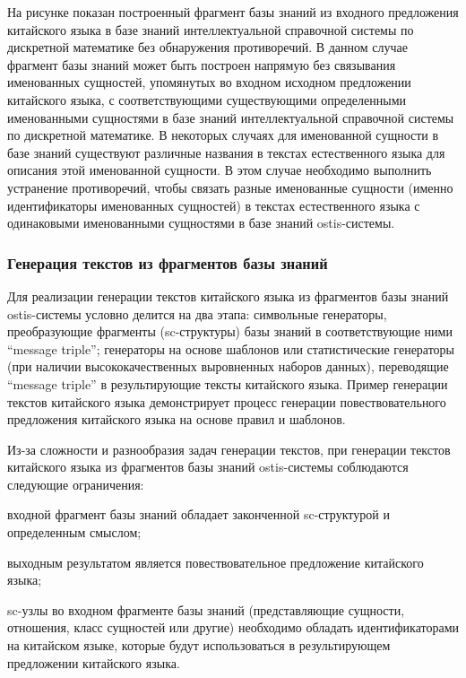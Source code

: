 На рисунке \textit{} показан построенный фрагмент базы знаний из входного предложения китайского языка в базе знаний интеллектуальной справочной системы по дискретной математике без обнаружения противоречий. В данном случае фрагмент базы знаний может быть построен напрямую без связывания именованных сущностей, упомянутых во входном исходном предложении китайского языка, с соответствующими существующими определенными именованными сущностями в базе знаний интеллектуальной справочной системы по дискретной математике. В некоторых случаях для именованной сущности в базе знаний существуют различные названия в текстах естественного языка для описания этой именованной сущности. В этом случае необходимо выполнить устранение противоречий, чтобы связать разные именованные сущности (именно идентификаторы именованных сущностей) в текстах естественного языка с одинаковыми именованными сущностями в базе знаний ostis-системы. 
\subsubsection{Генерация текстов из фрагментов базы знаний}
Для реализации генерации текстов китайского языка из фрагментов базы знаний ostis-системы условно делится на два этапа: символьные генераторы, преобразующие фрагменты (sc-структуры) базы знаний в соответствующие ними ``message triple''; генераторы на основе шаблонов или статистические генераторы (при наличии высококачественных выровненных наборов данных), переводящие ``message triple'' в результирующие тексты китайского языка. Пример генерации текстов китайского языка демонстрирует процесс генерации повествовательного предложения китайского языка на основе правил и шаблонов.

Из-за сложности и разнообразия задач генерации текстов, при генерации текстов китайского языка из фрагментов базы знаний ostis-системы соблюдаются следующие ограничения:
\begin{textitemize}
	\item входной фрагмент базы знаний обладает законченной sc-структурой и определенным смыслом;
	\item выходным результатом является повествовательное предложение китайского языка;
	\item sc-узлы во входном фрагменте базы знаний (представляющие сущности, отношения, класс сущностей или другие) необходимо обладать идентификаторами на китайском языке, которые будут использоваться в результирующем предложении китайского языка.
\end{textitemize}

